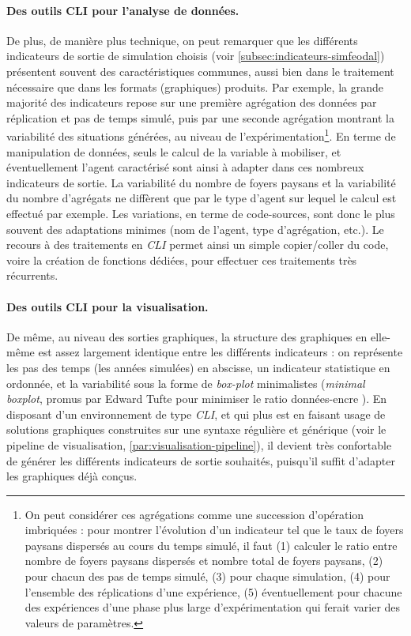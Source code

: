 \paragraph{Des outils CLI pour l'analyse de données.}
De plus, de manière plus technique, on peut remarquer que les différents indicateurs de sortie de simulation choisis (voir \cref{subsec:indicateurs-simfeodal}) présentent souvent des caractéristiques communes, aussi bien dans le traitement nécessaire que dans les formats (graphiques) produits.
Par exemple, la grande majorité des indicateurs repose sur une première agrégation des données par réplication et pas de temps simulé, puis par une seconde agrégation montrant la variabilité des situations générées, au niveau de l'expérimentation\footnote{
	On peut considérer ces agrégations comme une succession d'opération imbriquées : pour montrer l'évolution d'un indicateur tel que le taux de foyers paysans dispersés au cours du temps simulé, il faut (1) calculer le ratio entre nombre de foyers paysans dispersés et nombre total de foyers paysans, (2) pour chacun des pas de temps simulé, (3) pour chaque simulation, (4) pour l'ensemble des réplications d'une expérience, (5) éventuellement pour chacune des expériences d'une phase plus large d'expérimentation qui ferait varier des valeurs de paramètres.
}.
En terme de manipulation de données, seuls le calcul de la variable à mobiliser, et éventuellement l'agent caractérisé sont ainsi à adapter dans ces nombreux indicateurs de sortie.
La variabilité du nombre de foyers paysans et la variabilité du nombre d'agrégats ne diffèrent que par le type d'agent sur lequel le calcul est effectué par exemple.
Les variations, en terme de code-sources, sont donc le plus souvent des adaptations minimes (nom de l'agent, type d'agrégation, etc.).
Le recours à des traitements en \textit{CLI} permet ainsi un simple copier/coller du code, voire la création de fonctions dédiées, pour effectuer ces traitements très récurrents.

\paragraph{Des outils CLI pour la visualisation.}
De même, au niveau des sorties graphiques, la structure des graphiques en elle-même est assez largement identique entre les différents indicateurs : on représente les pas des temps (les années simulées) en abscisse, un indicateur statistique en ordonnée, et la variabilité sous la forme de \textit{box-plot} minimalistes (\og \textit{minimal boxplot}\fg{}, promus par Edward Tufte pour minimiser le ratio données-encre \autocite[123-125]{tufte_visual_2001}).
En disposant d'un environnement de type \textit{CLI}, et qui plus est en faisant usage de solutions graphiques construites sur une syntaxe régulière et générique (voir le \og pipeline de visualisation\fg{}, \cref{par:visualisation-pipeline}), il devient très confortable de générer les différents indicateurs de sortie souhaités, puisqu'il suffit d'adapter les graphiques déjà conçus.

